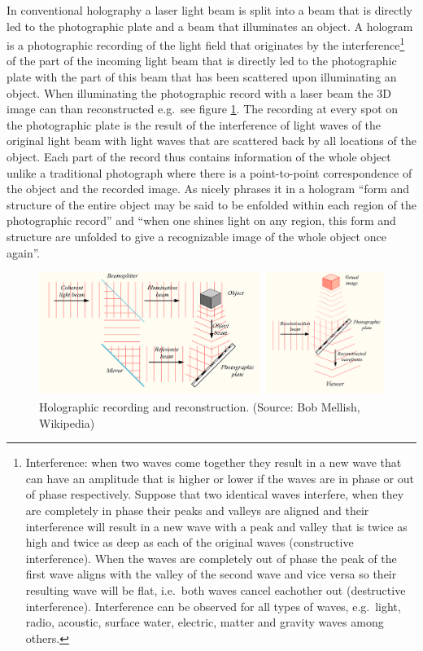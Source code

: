 \documentclass[
  11pt,
]{book}
\begin{document}
In conventional holography a laser light beam is split into a beam that is directly led to the photographic plate and a beam that illuminates an object. A hologram is a photographic recording of the light field that originates by the interference\footnote{Interference: when two waves come together they result in a new wave that can have an amplitude that is higher or lower if the waves are in phase or out of phase respectively. Suppose that two identical waves interfere, when they are completely in phase their peaks and valleys are aligned and their interference will result in a new wave with a peak and valley that is twice as high and twice as deep as each of the original waves (constructive interference). When the waves are completely out of phase the peak of the first wave aligns with the valley of the second wave and vice versa so their resulting wave will be flat, i.e.~both waves cancel eachother out (destructive interference). Interference can be observed for all types of waves, e.g.~light, radio, acoustic, surface water, electric, matter and gravity waves among others.} of the part of the incoming light beam that is directly led to the photographic plate with the part of this beam that has been scattered upon illuminating an object.
When illuminating the photographic record with a laser beam the 3D image can than reconstructed e.g.~see figure \ref{fig:hologram1}. The recording at every spot on the photographic plate is the result of the interference of light waves of the original light beam with light waves that are scattered back by all locations of the object. Each part of the record thus contains information of the whole object unlike a traditional photograph where there is a point-to-point correspondence of the object and the recorded image. As \citet{bohm1980} nicely phrases it in a hologram ``form and structure of the entire object may be said to be enfolded within each region of the photographic record'' and ``when one shines light on any region, this form and structure are unfolded to give a recognizable image of the whole object once again''.

\begin{figure}

{\centering \includegraphics[width=1\linewidth]{./figs/holographySmall} 

}

\caption{Holographic recording and reconstruction. (Source: Bob Mellish, Wikipedia)}\label{fig:hologram1}
\end{figure}
\end{document}
